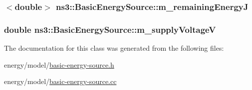 \subsubsection[{\texorpdfstring{m\+\_\+remaining\+EnergyJ}{m_remainingEnergyJ}}]{$<$double$>$ ns3\+::\+Basic\+Energy\+Source\+::m\+\_\+remaining\+EnergyJ\hspace{0.3cm}{\ttfamily [private]}}\hypertarget{classns3_1_1BasicEnergySource_abf17a7a388b23d98fa67944a25d55c40}{}\label{classns3_1_1BasicEnergySource_abf17a7a388b23d98fa67944a25d55c40}
\subsubsection[{\texorpdfstring{m\+\_\+supply\+VoltageV}{m_supplyVoltageV}}]{\setlength{\rightskip}{0pt plus 5cm}double ns3\+::\+Basic\+Energy\+Source\+::m\+\_\+supply\+VoltageV\hspace{0.3cm}{\ttfamily [private]}}\hypertarget{classns3_1_1BasicEnergySource_aef36736600c87d25637b0aebd140221f}{}\label{classns3_1_1BasicEnergySource_aef36736600c87d25637b0aebd140221f}


The documentation for this class was generated from the following files\+:\begin{DoxyCompactItemize}
\item 
energy/model/\hyperlink{basic-energy-source_8h}{basic-\/energy-\/source.\+h}\item 
energy/model/\hyperlink{basic-energy-source_8cc}{basic-\/energy-\/source.\+cc}\end{DoxyCompactItemize}
